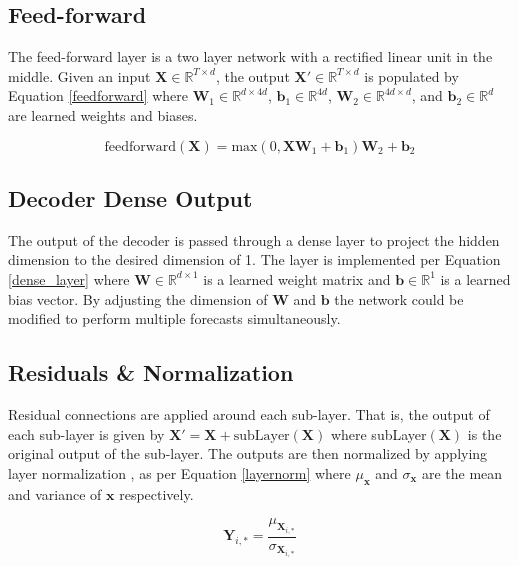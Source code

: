 \subsection{Feed-forward}
The feed-forward layer is a two layer network with a rectified linear unit in the middle.
Given an input $\boldsymbol{X} \in \mathbb{R}^{T \times d}$, the output $\boldsymbol{X'} \in \mathbb{R}^{T \times d}$ is populated by Equation \ref{feedforward} where $\boldsymbol{W}_1 \in \mathbb{R}^{d \times 4d}$, $\boldsymbol{b}_1 \in \mathbb{R}^{4d}$, $\boldsymbol{W}_2 \in \mathbb{R}^{4d \times d}$, and $\boldsymbol{b}_2 \in \mathbb{R}^{d}$ are learned weights and biases.

\begin{equation} \label{feedforward}
\text{feedforward}(\boldsymbol{X}) = \text{max}(0, \boldsymbol{X}  \boldsymbol{W}_1 + \boldsymbol{b}_1)  \boldsymbol{W}_2 + \boldsymbol{b}_2
\end{equation}

\subsection{Decoder Dense Output}
The output of the decoder is passed through a dense layer to project the hidden dimension to the desired dimension of 1.
The layer is implemented per Equation \ref{dense_layer} where $\boldsymbol{W} \in \mathbb{R}^{d \times 1}$ is a learned weight matrix and $\boldsymbol{b} \in \mathbb{R}^{1}$ is a learned bias vector.
By adjusting the dimension of $\boldsymbol{W}$ and $\boldsymbol{b}$ the network could be modified to perform multiple forecasts simultaneously.


\subsection{Residuals \& Normalization}
Residual connections \cite{He2015} are applied around each sub-layer.
That is, the output of each sub-layer is given by $\boldsymbol{X'} = \boldsymbol{X} + \text{subLayer}(\boldsymbol{X})$ where subLayer$(\boldsymbol{X})$ is the original output of the sub-layer.
The outputs are then normalized by applying layer normalization \cite{Ba2016}, as per Equation \ref{layernorm} where $\mu_{\boldsymbol{x}}$ and $\sigma_{\boldsymbol{x}}$ are the mean and variance of $\boldsymbol{x}$ respectively.

\begin{equation} \label{layernorm}
\boldsymbol{Y}_{i,*} = \frac{\mu_{\boldsymbol{X}_{i,*}}}{\sigma_{\boldsymbol{X}_{i,*}}}
\end{equation}

